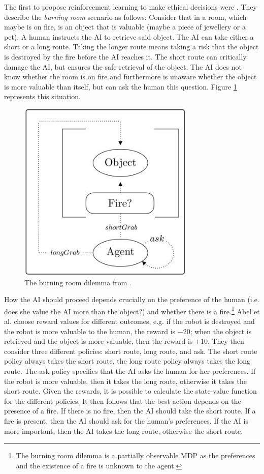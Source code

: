 The first to propose reinforcement learning to make ethical decisions were \citet{abel2016reinforcement}. They describe the \emph{burning room} scenario as follows: Consider that in a room, which maybe is on fire, is an object that is valuable (maybe a piece of jewellery or a pet). A human instructs the AI to retrieve said object. The AI can take either a short or a long route. Taking the longer route means taking a risk that the object is destroyed by the fire before the AI reaches it. The short route can critically damage the AI, but ensures the safe retrieval of the object. The AI does not know whether the room is on fire and furthermore is unaware whether the object is more valuable than itself, but can ask the human this question. Figure \ref{fig:burning} represents this situation.

\begin{figure}[h]
    \centering
    \includegraphics[scale=0.75]{Graphics/burning.JPG}
    \caption{The burning room dilemma from \citet{abel2016reinforcement}.}
    \label{fig:burning}
\end{figure}

How the AI should proceed depends crucially on the preference of the human (i.e. does she value the AI more than the object?) and whether there is a fire.\footnote{The burning room dilemma is a partially observable MDP as the preferences and the existence of a fire is unknown to the agent.} Abel et al. choose reward values for different outcomes, e.g. if the robot is destroyed and the robot is more valuable to the human, the reward is $-20$; when the object is retrieved and the object is more valuable, then the reward is $+10$. They then consider three different policies: short route, long route, and ask. The short route policy always takes the short route, the long route policy always takes the long route. The ask policy specifies that the AI asks the human for her preferences. If the robot is more valuable, then it takes the long route, otherwise it takes the short route. Given the rewards, it is possible to calculate the state-value function for the different policies. It then follows that the best action depends on the presence of a fire. If there is no fire, then the AI should take the short route. If a fire is present, then the AI should ask for the human's preferences. If the AI is more important, then the AI takes the long route, otherwise the short route. 

